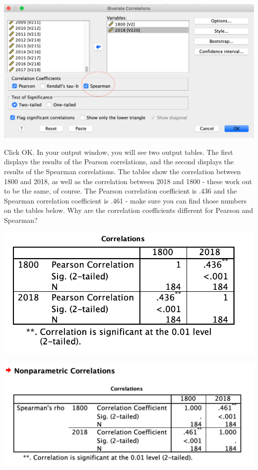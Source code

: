 \documentclass[
]{book}
\begin{document}
\includegraphics{img/12.2.2.png}

Click {OK}. In your output window, you will see two output tables. The first displays the results of the Pearson correlations, and the second displays the results of the Spearman correlations. The tables show the correlation between 1800 and 2018, as well as the correlation between 2018 and 1800 - these work out to be the same, of course. The Pearson correlation coefficient is .436 and the Spearman correlation coefficient is .461 - make sure you can find those numbers on the tables below. Why are the correlation coefficients different for Pearson and Spearman?

\includegraphics{img/12.2.3.png}

\includegraphics{img/12.2.4.png}
\end{document}
